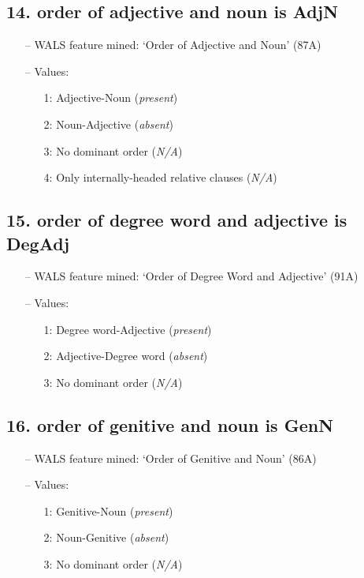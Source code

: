 \subsection*{14. order of adjective and noun is AdjN}

\begin{itemize}
\item[--] WALS feature mined: `Order of Adjective and Noun' (87A)
\item[--] Values:

\begin{enumerate}
\item[1:] Adjective-Noun (\emph{present})
\item[2:] Noun-Adjective (\emph{absent})
\item[3:] No dominant order (\emph{N/A})
\item[4:] Only internally-headed relative clauses (\emph{N/A})
\end{enumerate}
\end{itemize}

\subsection*{15. order of degree word and adjective is DegAdj}

\begin{itemize}
\item[--] WALS feature mined: `Order of Degree Word and Adjective' (91A)
\item[--] Values:

\begin{enumerate}
\item[1:] Degree word-Adjective (\emph{present})
\item[2:] Adjective-Degree word (\emph{absent})
\item[3:] No dominant order (\emph{N/A})
\end{enumerate}
\end{itemize}

\subsection*{16. order of genitive and noun is GenN}

\begin{itemize}
\item[--] WALS feature mined: `Order of Genitive and Noun' (86A)
\item[--] Values:

\begin{enumerate}
\item[1:] Genitive-Noun (\emph{present})
\item[2:] Noun-Genitive (\emph{absent})
\item[3:] No dominant order (\emph{N/A})
\end{enumerate}
\end{itemize}

